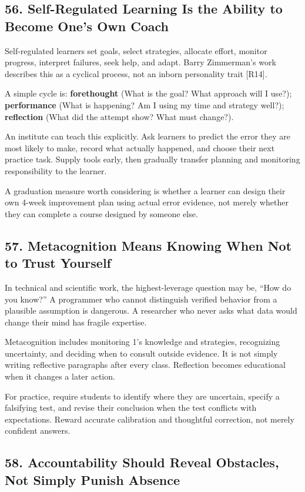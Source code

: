 \subsection*{56. Self-Regulated Learning Is the Ability to Become One's Own Coach}

Self-regulated learners set goals, select strategies, allocate effort, monitor progress, interpret failures, seek help, and adapt. Barry Zimmerman's work describes this as a cyclical process, not an inborn personality trait [R14].

A simple cycle is: \textbf{forethought} (What is the goal? What approach will I use?); \textbf{performance} (What is happening? Am I using my time and strategy well?); \textbf{reflection} (What did the attempt show? What must change?).

An institute can teach this explicitly. Ask learners to predict the error they are most likely to make, record what actually happened, and choose their next practice task. Supply tools early, then gradually transfer planning and monitoring responsibility to the learner.

A graduation measure worth considering is whether a learner can design their own 4-week improvement plan using actual error evidence, not merely whether they can complete a course designed by someone else.

\subsection*{57. Metacognition Means Knowing When Not to Trust Yourself}

In technical and scientific work, the highest-leverage question may be, ``How do you know?'' A programmer who cannot distinguish verified behavior from a plausible assumption is dangerous. A researcher who never asks what data would change their mind has fragile expertise.

Metacognition includes monitoring 1's knowledge and strategies, recognizing uncertainty, and deciding when to consult outside evidence. It is not simply writing reflective paragraphs after every class. Reflection becomes educational when it changes a later action.

For practice, require students to identify where they are uncertain, specify a falsifying test, and revise their conclusion when the test conflicts with expectations. Reward accurate calibration and thoughtful correction, not merely confident answers.

\subsection*{58. Accountability Should Reveal Obstacles, Not Simply Punish Absence}

